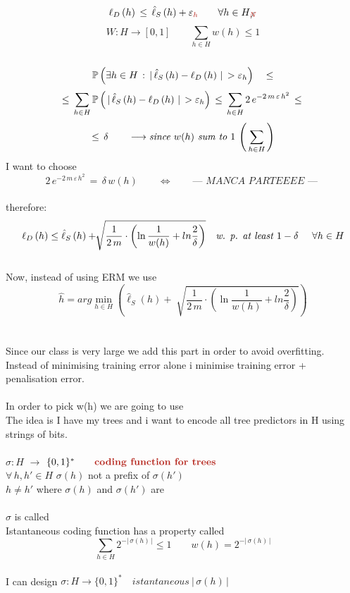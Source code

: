 \documentclass[../main.tex]{subfiles}
\begin{document}
$$
\ell_D \left(h\right) \, \leq \, \hat{\ell}_S \left(h\right) + \varepsilon_{\red{h}} \qquad \forall h \in H_{\not{\red{N}}}
$$
$$
W : H \longrightarrow \left[ 0,1 \right] \qquad \sum_{h\in H}{} w\left(h\right) \leq 1
$$
\\
$$
\mathbb{P} \left( \exists h \in H \, : \, | \, \hat{\ell}_S \left(h \right) - \ell_D \left( h \right) \, | \, > \varepsilon_h \right) \quad \leq
$$
$$
\leq \, 
\sum_{h \in H}{} 
\mathbb{P} \left( \, | \, \hat{\ell}_S 
\left(h \right) 
- 
\ell_D 
\left( h \right) 
\, | \, 
> \varepsilon_h \right) \, \leq \, \sum_{h \in H}{} 2 \, e^{-2 \, m \, \varepsilon \, h^2 } \, \leq \, $$
$$
\leq \, \delta \qquad \longrightarrow \textit{since $w(h)$ sum to $1$ $ \left( \, \sum_{h \in H} \, \right)  $}
$$
I want to choose 
\\
$$
2 \, e^{-2 \, m \, \varepsilon \, h^2 } \, =\, \delta \, w(h) \qquad \Leftrightarrow \qquad \textit{--- MANCA PARTEEEE --- }
$$\\
therefore:
$$
\ell_D \left(h \right) \leq 
\hat{\ell}_S \left(h\right) + 
\sqrt[]{\frac{1}{2 \, m} \cdot \left( \ln \frac{1}{w(h)} + ln \frac{2}{\delta} \right) } \quad \textit{w. p. at least $1-\delta$ \quad $\forall h \in H$} 
$$
\\
Now, instead of using ERM we use
$$
\hat{h} = arg\min_{h \in H} \left(\hat{\ell}_S\left( h \right) 
+ 
\sqrt[]{ \frac{1}{2 \, m} \cdot \left( \ln \frac{1}{w(h)} + ln \frac{2}{\delta} \right) }
\right)
$$
\\\\
Since our class is very large we add this part in order to avoid overfitting. \\
Instead of minimising training error alone i minimise training error +
penalisation error.\\\\
In order to pick w(h) we are going to use \\
The idea is I have my trees and i want to encode all tree predictors in H using
strings of bits.
\\\\
$\sigma : H $ $\longrightarrow $ $\{ 0,1 \}^* \qquad \bred{coding function for trees}
$
\\
$\forall \, h, h' \in H$ \qquad $\sigma(h)$ not a prefix of $\sigma(h') 
$\\
$h \neq h'$ \qquad \qquad where $\sigma(h)$ and $\sigma(h')$ are 
\\\\
$\sigma$ is called 
\\
Istantaneous coding function has a property called 
$$
\sum_{h\in H}{} 2^{-|\, \sigma\left(h\right)\, |} \leq 1 \qquad w(h) = 2^{-|\,\sigma(h)\,|}
$$
\\
I can design $\sigma : H \longrightarrow \{0,1\}^* \quad  istantaneous \ |\,\sigma(h)\,|$\\
\end{document}
